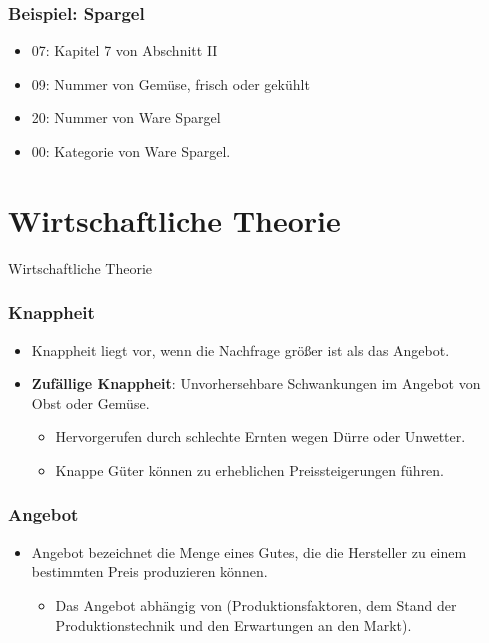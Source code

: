 \documentclass{beamer}
\begin{document}
\begin{frame}
\frametitle{Beispiel: Spargel}
      \begin{itemize}
        \item
07: Kapitel 7 von Abschnitt II
        \item
09: Nummer von Gemüse, frisch oder gekühlt
        \item
20: Nummer von Ware Spargel
        \item
00: Kategorie von Ware Spargel.
      \end{itemize}
\end{frame}

\section{Wirtschaftliche Theorie} %
\begin{frame}
	\begin{center}
		{\Huge Wirtschaftliche Theorie}
	\end{center}
\end{frame}

\begin{frame}
\frametitle{Knappheit}
  \begin{itemize}
    \item
  Knappheit liegt vor, wenn die Nachfrage größer ist als
  das Angebot.
    \item
      \textbf{Zufällige Knappheit}: Unvorhersehbare Schwankungen
  im Angebot von Obst oder Gemüse.
      \begin{itemize}
        \item
  Hervorgerufen durch schlechte Ernten wegen Dürre oder
  Unwetter.
\item
Knappe Güter können zu erheblichen Preissteigerungen führen.
  \end{itemize}
      \end{itemize}
\end{frame}

\begin{frame}
\frametitle{Angebot}
  \begin{itemize}
    \item
Angebot bezeichnet die Menge eines Gutes, die die
Hersteller zu einem bestimmten Preis produzieren
können.
      \begin{itemize}
        \item
  Das Angebot abhängig von (Produktionsfaktoren, dem Stand
  der Produktionstechnik und den Erwartungen an den Markt).
      \end{itemize}
  \end{itemize}
\end{frame}
\end{document}
